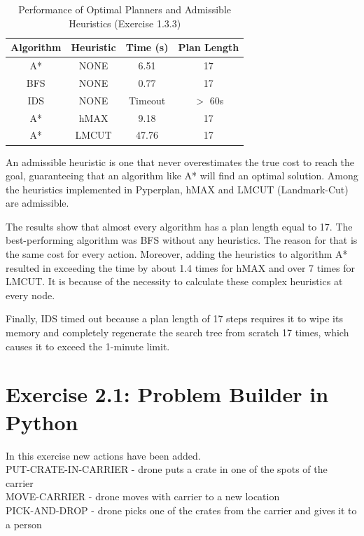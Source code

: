 \documentclass{article}
\begin{document}
\begin{table}[H]
\centering
\begin{tabular}{|c|c|c|c|}
\hline
\textbf{Algorithm} & \textbf{Heuristic} & \textbf{Time (s)} & \textbf{Plan Length} \\ \hline
A* & NONE & 6.51 & 17 \\ \hline
BFS & NONE & 0.77 & 17 \\ \hline
IDS & NONE & Timeout & $>$ 60s \\ \hline
A* & hMAX & 9.18 & 17 \\ \hline
A* & LMCUT & 47.76 & 17 \\ \hline
\end{tabular}
\caption{Performance of Optimal Planners and Admissible Heuristics (Exercise 1.3.3)}
\label{tab:results_1_3_3}
\end{table}
An admissible heuristic is one that never overestimates the true cost to reach the goal, guaranteeing that an algorithm like A* will find an optimal solution. Among the heuristics implemented in Pyperplan, hMAX and LMCUT (Landmark-Cut) are admissible.

The results show that almost every algorithm has a plan length equal to 17. The best-performing algorithm was BFS without any heuristics. The reason for that is the same cost for every action. Moreover, adding the heuristics to algorithm A* resulted in exceeding the time by about 1.4 times for hMAX and over 7 times for LMCUT. It is because of the necessity to calculate these complex heuristics at every node.

Finally, IDS timed out because a plan length of 17 steps requires it to wipe its memory and completely regenerate the search tree from scratch 17 times, which causes it to exceed the 1-minute limit.

\section{Exercise 2.1: Problem Builder in Python}
In this exercise new actions have been added.
\\PUT-CRATE-IN-CARRIER - drone puts a crate in one of the spots of the carrier
\\MOVE-CARRIER - drone moves with carrier to a new location
\\PICK-AND-DROP - drone picks one of the crates from the carrier and gives it to a person
\\
\end{document}
